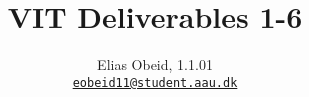 \documentclass[a4paper, 12pt, twoside, article]{memoir}
\title{VIT Deliverables 1-6}
\author{Elias Obeid, 1.1.01\\ \href{mailto:eobeid11@student.aau.dk}{\texttt{eobeid11@student.aau.dk}}}
\begin{document}
\frontmatter
\maketitle
\pagebreak
\mainmatter


\newpage

\end{document}
